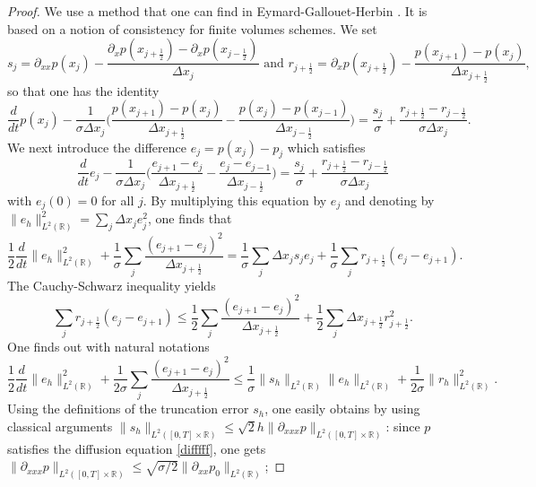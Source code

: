 \documentclass[a4paper,french,english,10pt]{article}
\begin{document}
\begin{proof}
We  use a  method that one can find in  Eymard-Gallouet-Herbin   \cite{FV}. It is %
 based on  a notion of consistency for finite volumes schemes.
We set
$$
s_j=\partial_{xx}p(x_j)-\frac{\partial_xp(x_{j+\frac12}  )
-
\partial_xp(x_{j-\frac12}  )
}{\Delta x_j}
\mbox{ and }
r_{j+\frac12}=\partial_{x}p(x_{j+\frac12})-\frac{p(x_{j+1}  )
-
p(x_{j}  )
}{\Delta x_{j+\frac12}},
$$
so that one has the identity
$$
 \frac{d}{dt} p(x_j)
-\frac{1}{\sigma\Delta x_j}\bigg(\frac{p(x_{j+1})-p(x_{j})}{\Delta
x_{j+\frac12 }}-\frac{p(x_{j})-p(x_{j-1})}{\Delta
x_{j-\frac12 }}\bigg)=
\frac{s_j}\sigma+
\frac{r_{j+\frac12}-r_{j-\frac12}}{\sigma \Delta x_j}.
$$
We next  introduce the difference
$e_j=p(x_j)-p_j$ which satisfies
$$
 \frac{d}{dt} e_j
-\frac{1}{\sigma\Delta x_j}\bigg(\frac{e_{j+1}-e_{j}}{\Delta
x_{j+\frac12 }}-\frac{e_{j}-e_{j-1}}{\Delta
x_{j-\frac12 }}\bigg)=
\frac{s_j}\sigma+
\frac{r_{j+\frac12}-r_{j-\frac12}}{\sigma \Delta x_j}
$$
with $e_j(0)=0$ for all $j$.
By multiplying this equation by $e_j$
and  denoting by $\|e_h\|_{L^2(\mathbb{R})}^2= \sum_j \Delta x_je_j^2$,
one finds that 
\begin{equation*}\label{fgfg}
\frac12 \frac{d}{dt}\|e_h\|_{L^2(\mathbb{R})}^2 +\frac{1}{\sigma} \sum_j
\frac{(e_{j+1}-e_{j})^2}{\Delta
x_{j+\frac12 }}=
\frac{1}{\sigma}\sum_j \Delta x_j s_j e_j+\frac{1}{\sigma}\sum_jr_{j+\frac12 }(e_j-e_{j+1}).
\end{equation*}
The Cauchy-Schwarz inequality yields 
\begin{equation*}
\sum_jr_{j+\frac12 }(e_j-e_{j+1})\leq \frac{1}{2} \sum_j
\frac{(e_{j+1}-e_{j})^2}{\Delta x_{j+\frac12 }}+\frac{1}{2}\sum_j\Delta
x_{j+\frac12 }r_{j+\frac12 }^2.
\end{equation*}
One finds out with natural notations
\begin{equation} \label{eq:eee}
\frac12 \frac{d}{dt} \|e_h\|_{L^2(\mathbb{R})}^2+
\frac{1}{2 \sigma} \sum_j
\frac{(e_{j+1}-e_{j})^2}{\Delta x_{j+\frac12 }}\leq
\frac{1}{\sigma}\| s_h\|_{L^2(\mathbb{R})} \|e_h\|_{L^2(\mathbb{R})}+
\frac{1}{2\sigma} \|r_h\|^2_{L^2(\mathbb{R})}.
\end{equation}
Using the  definitions of  the truncation error $s_h$, one easily obtains by using classical arguments $\|s_h\|_{L^2([0,T]\times\mathbb{R})}\leq \sqrt{2}h\|\partial_{xxx}p\|_{L^2([0,T]\times\mathbb{R})}$: since $p$ satisfies the diffusion equation \eqref{difffff}, one gets $\|\partial_{xxx}p\|_{L^2([0,T]\times\mathbb{R})} \leq \sqrt{\sigma/2} \|\partial_{xx}p_0\|_{L^2(\mathbb{R})}$;

\end{proof}
\end{document}
